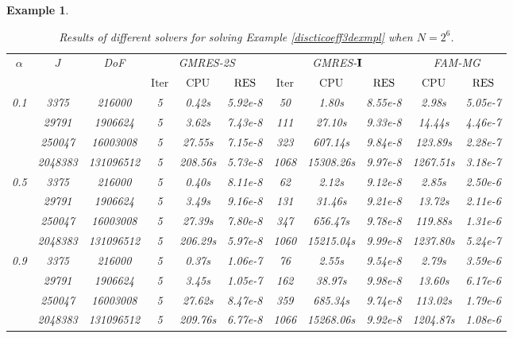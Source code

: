 \documentclass[11pt]{article}%
\numberwithin{equation}{section}
\newtheorem{example}{Example}
\begin{document}
\begin{example}
{		\begin{table}[H]
			\begin{center}
				\caption{Results of different solvers for solving Example \ref{discticoeff3dexmpl} when  $N=2^6$.}\label{expl3ddisctctb2}
				\setlength{\tabcolsep}{0.35em}
				\begin{tabular}[c]{ccc|ccc|ccc|cc}
					\hline
					\multirow{2}{*}{$\alpha$} &\multirow{2}{*}{$J$} &\multirow{2}{*}{DoF}& \multicolumn{3}{c|}{GMRES-2S} &\multicolumn{3}{c|}{GMRES-${\bf I}$}& \multicolumn{2}{c}{FAM-MG}  \\
					\cline{4-11}
					&&&$\mathrm{Iter}$&$\mathrm{CPU}$&${\rm RES}$&$\mathrm{Iter}$&$\mathrm{CPU}$&${\rm RES}$&$\mathrm{CPU}$&${\rm RES}$\\
					\hline
					\multirow{4}{*}{0.1} 
					&3375    &216000   &5   &0.42s   &5.92e-8 &50  &1.80s    &8.55e-8&2.98s   &5.05e-7 \\
					&29791   &1906624  &5   &3.62s   &7.43e-8 &111 &27.10s   &9.33e-8&14.44s  &4.46e-7 \\
					&250047  &16003008 &5   &27.55s  &7.15e-8 &323 &607.14s  &9.84e-8&123.89s &2.28e-7 \\
					&2048383 &131096512&5   &208.56s &5.73e-8 &1068&15308.26s&9.97e-8&1267.51s&3.18e-7 \\
					\hline
					\multirow{4}{*}{0.5} 
					&3375    &216000   &5   &0.40s   &8.11e-8 &62  &2.12s    &9.12e-8&2.85s   &2.50e-6 \\
					&29791   &1906624  &5   &3.49s   &9.16e-8 &131 &31.46s   &9.21e-8&13.72s  &2.11e-6 \\
					&250047  &16003008 &5   &27.39s  &7.80e-8 &347 &656.47s  &9.78e-8&119.88s &1.31e-6 \\
					&2048383 &131096512&5   &206.29s &5.97e-8 &1060&15215.04s&9.99e-8&1237.80s&5.24e-7 \\
					\hline
					\multirow{4}{*}{0.9}
					&3375    &216000   &5   &0.37s   &1.06e-7 &76  &2.55s    &9.54e-8&2.79s   &3.59e-6 \\
					&29791   &1906624  &5   &3.45s   &1.05e-7 &162 &38.97s   &9.98e-8&13.60s  &6.17e-6 \\
					&250047  &16003008 &5   &27.62s  &8.47e-8 &359 &685.34s  &9.74e-8&113.02s &1.79e-6 \\
					&2048383 &131096512&5   &209.76s &6.77e-8 &1066&15268.06s&9.92e-8&1204.87s&1.08e-6 \\
					\hline
				\end{tabular}
			\end{center}
		\end{table}
	}
\end{example}
\end{document}
